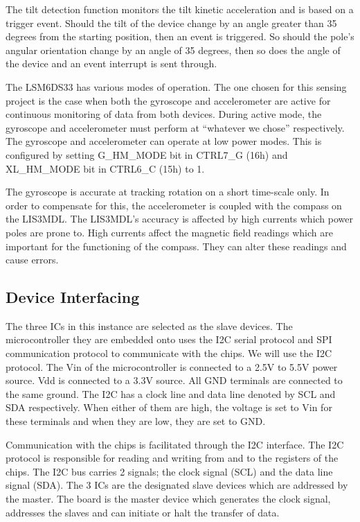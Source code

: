 \documentclass[12pt]{article}
\begin{document}
The tilt detection function monitors the tilt kinetic acceleration and is based on a trigger event. Should the tilt of 
the device change by an angle greater than 35 degrees from the starting position, then an event is triggered. So should 
the pole’s angular orientation change by an angle of 35 degrees, then so does the angle of the device and an event 
interrupt is sent through.

The LSM6DS33 has various modes of operation. The one chosen for this sensing project is the case when both the gyroscope
and accelerometer are active for continuous monitoring of data from both devices. During active mode, the gyroscope and 
accelerometer must perform at “whatever we chose” respectively. The gyroscope and accelerometer can operate at low power
modes. This is configured by setting G_HM_MODE bit in CTRL7_G (16h) and XL_HM_MODE bit in CTRL6_C (15h) to 1. 

The gyroscope is accurate at tracking rotation on a short time-scale only. In order to compensate for this, the 
accelerometer is coupled with the compass on the LIS3MDL.
The LIS3MDL’s accuracy is affected by high currents which power poles are prone to. High currents affect the magnetic 
field readings which are important for the functioning of the compass. They can alter these readings and cause errors.

\subsection{Device Interfacing}
The three ICs in this instance are selected as the slave devices. The microcontroller they are embedded onto uses the 
I2C serial protocol and SPI communication protocol to communicate with the chips. We will use the I2C protocol. 
The Vin of the microcontroller is connected to a 2.5V to 5.5V power source. Vdd is connected to a 3.3V source.
All GND terminals are connected to the same ground. The I2C has a clock line and data line denoted by SCL and SDA 
respectively. When either of them are high, the voltage is set to Vin for these terminals and when they are low, they 
are set to GND. 

Communication with the chips is facilitated through the I2C interface. 
The I2C protocol is responsible for reading and writing from and to the registers of the chips. 
The I2C bus carries 2 signals; the clock signal (SCL) and the data line signal (SDA). The 3 ICs are the designated slave
devices which are addressed by the master. The board is the master device which generates the clock signal, addresses 
the slaves and can initiate or halt the transfer of data.
\end{document}

